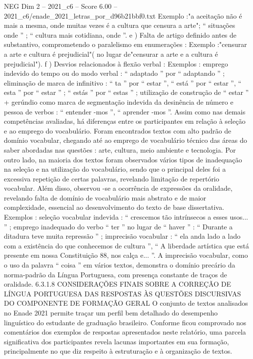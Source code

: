 \begin{textsample}{NEG Dim 2 – 2021\_c6 – Score 6.00 – 2021\_c6/enade\_2021\_letras\_por\_d96b21bbf0.txt}
Exemplo :"a aceitação não é mais a mesma, onde muitas vezes é a cultura que censura a arte"; “ situações onde ” ; “ cultura mais cotidiana, onde ”. e ) Falta de artigo definido antes de substantivo, comprometendo o paralelismo em enumerações : Exemplo :"censurar a arte e cultura é prejudicial"( no lugar de"censurar a arte e a cultura é prejudicial"). f ) Desvios relacionados à flexão verbal : Exemplos : emprego indevido do tempo ou do modo verbal : “ adaptado ” por “ adaptando ” ; eliminação de marca de infinitivo : “ ta ” por “ estar ”, “ está ” por “ estar ”, “ esta ” por “ estar ” ; “ estás ” por “ estas ” ; utilização de construção de “ estar ” + gerúndio como marca de segmentação indevida da desinência de número e pessoa de verbos : “ entender -mos ”, “ aprender -mos ”.
Assim como nas demais competências avaliadas, há diferenças entre os participantes em relação à seleção e ao emprego do vocabulário.
Foram encontrados textos com alto padrão de domínio vocabular, chegando até ao emprego de vocabulário técnico das áreas do saber abordadas nas questões : arte, cultura, meio ambiente e tecnologia.
Por outro lado, na maioria dos textos foram observados vários tipos de inadequação na seleção e na utilização do vocabulário, sendo que o principal deles foi a excessiva repetição de certas palavras, revelando limitação de repertório vocabular.
Além disso, observou -se a ocorrência de expressões da oralidade, revelando falta de domínio de vocabulário mais abstrato e de maior complexidade, essencial ao desenvolvimento do texto de base dissertativa.
Exemplos : seleção vocabular indevida : “ crescemos tão intrínsecos a esses usos... ” ; emprego inadequado do verbo “ ter ” no lugar de “ haver ” : “ Durante a ditadura teve muita repressão ” ; imprecisão vocabular : “ ela anda lado a lado com a existência do que conhecemos de cultura ”, “ A liberdade artística que está presente em nossa Constituição 88, nos calça e... ”.
A imprecisão vocabular, como o uso da palavra “ coisa ” em vários textos, demonstra o domínio precário da norma-padrão da Língua Portuguesa, com presença constante de traços de oralidade. 6.3.1.8 CONSIDERAÇÕES FINAIS SOBRE A CORREÇÃO DE LÍNGUA PORTUGUESA DAS RESPOSTAS ÀS QUESTÕES DISCURSIVAS DO COMPONENTE DE FORMAÇÃO GERAL O conjunto de textos analisados no Enade 2021 permite traçar um perfil bem detalhado do desempenho linguístico do estudante de graduação brasileiro.
Conforme ficou comprovado nos comentários dos exemplos de respostas apresentados neste relatório, uma parcela significativa dos participantes revela lacunas importantes em sua formação, principalmente no que diz respeito à estruturação e à organização de textos.

\end{textsample}
